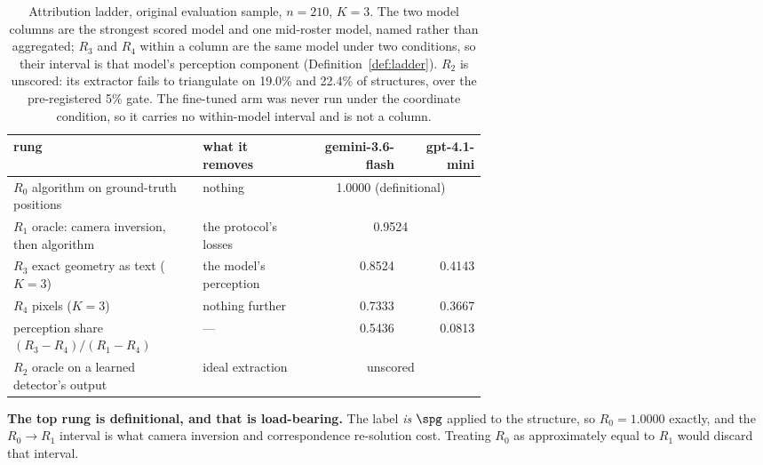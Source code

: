 \begin{table}[t]
\centering
\caption{Attribution ladder, original evaluation sample, $n=210$, $K{=}3$. The two model columns are the
strongest scored model and one mid-roster model, named rather than aggregated; $R_3$ and $R_4$ within
a column are the same model under two conditions, so their interval is that model's perception component
(Definition~\ref{def:ladder}). $R_2$ is unscored: its extractor fails to triangulate on 19.0\% and 22.4\%
of structures, over the pre-registered 5\% gate. The fine-tuned arm was never run under the coordinate
condition, so it carries no within-model interval and is not a column.}
\label{tab:rungs}
\small
\setlength{\tabcolsep}{4.5pt}
\begin{tabular}{p{0.40\linewidth}p{0.22\linewidth}rr}
\toprule
rung & what it removes & \small gemini-3.6-flash & \small gpt-4.1-mini \\
\midrule
$R_0$ algorithm on ground-truth positions & nothing & \multicolumn{2}{c}{1.0000 (definitional)} \\
$R_1$ oracle: camera inversion, then algorithm & the protocol's losses & \multicolumn{2}{c}{0.9524} \\
$R_3$ exact geometry as text ($K{=}3$) & the model's perception & 0.8524 & 0.4143 \\
$R_4$ pixels ($K{=}3$) & nothing further & 0.7333 & 0.3667 \\
\midrule
perception share $(R_3-R_4)/(R_1-R_4)$ & --- & 0.5436 & 0.0813 \\
$R_2$ oracle on a learned detector's output & ideal extraction & \multicolumn{2}{c}{unscored} \\
\bottomrule
\end{tabular}
\end{table}

\textbf{The top rung is definitional, and that is load-bearing.} The label \emph{is} $\spg$ applied to the
structure, so $R_0 = 1.0000$ exactly, and the $R_0 \to R_1$ interval is what camera inversion and
correspondence re-solution cost. Treating $R_0$ as approximately equal to $R_1$ would discard that
interval.

